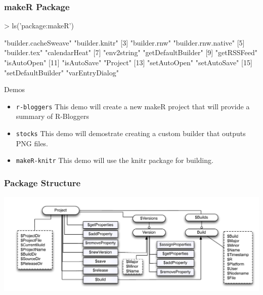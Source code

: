 \documentclass[10pt,slidestop,mathserif,c]{beamer}
\begin{document}
\begin{frame}
	\frametitle{makeR Package}
\begin{Schunk}
\begin{Sinput}
> ls('package:makeR')
\end{Sinput}
\begin{Soutput}
 [1] "builder.cacheSweave" "builder.knitr"      
 [3] "builder.rnw"         "builder.rnw.native" 
 [5] "builder.tex"         "calendarHeat"       
 [7] "env2string"          "getDefaultBuilder"  
 [9] "getRSSFeed"          "isAutoOpen"         
[11] "isAutoSave"          "Project"            
[13] "setAutoOpen"         "setAutoSave"        
[15] "setDefaultBuilder"   "varEntryDialog"     
\end{Soutput}
\end{Schunk}
	\pause
	Demos
	\begin{itemize}
		\item \texttt{r-bloggers} This demo will create a new makeR project that will provide a summary of R-Bloggers
		\item \texttt{stocks} This demo will demostrate creating a custom builder that outputs PNG files.
		\item \texttt{makeR-knitr} This demo will use the knitr package for building.
	\end{itemize}
\end{frame}


\begin{frame}
	\frametitle{Package Structure}
	\begin{center}
		\includegraphics[width=\textwidth]{makeRClassDiagram.pdf}
	\end{center}
\end{frame}
\end{document}
